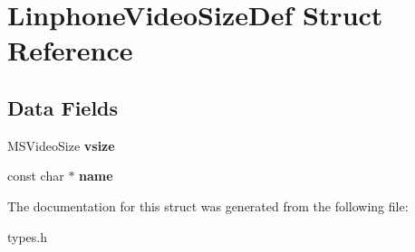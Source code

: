 \section{Linphone\+Video\+Size\+Def Struct Reference}
\label{structLinphoneVideoSizeDef}
\subsection*{Data Fields}
\begin{DoxyCompactItemize}
\item 
\mbox{\label{structLinphoneVideoSizeDef_a8b5957177edf64b176ba0fa00f1d9b22}} 
M\+S\+Video\+Size {\bfseries vsize}
\item 
\mbox{\label{structLinphoneVideoSizeDef_ac3aafa693ab2e325e8531b639ab83f26}} 
const char $\ast$ {\bfseries name}
\end{DoxyCompactItemize}


The documentation for this struct was generated from the following file\+:\begin{DoxyCompactItemize}
\item 
types.\+h\end{DoxyCompactItemize}
